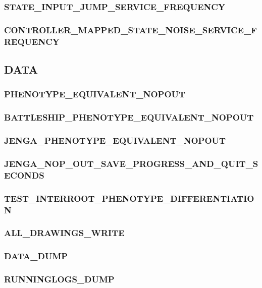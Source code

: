 \subsubsection{STATE\_INPUT\_JUMP\_SERVICE\_FREQUENCY}

\subsubsection{CONTROLLER\_MAPPED\_STATE\_NOISE\_SERVICE\_FREQUENCY}

\subsection{DATA}

\subsubsection{PHENOTYPE\_EQUIVALENT\_NOPOUT}

\subsubsection{BATTLESHIP\_PHENOTYPE\_EQUIVALENT\_NOPOUT}

\subsubsection{JENGA\_PHENOTYPE\_EQUIVALENT\_NOPOUT}

\subsubsection{JENGA\_NOP\_OUT\_SAVE\_PROGRESS\_AND\_QUIT\_SECONDS}

\subsubsection{TEST\_INTERROOT\_PHENOTYPE\_DIFFERENTIATION}

\subsubsection{ALL\_DRAWINGS\_WRITE}

\subsubsection{DATA\_DUMP}

\subsubsection{RUNNINGLOGS\_DUMP}

